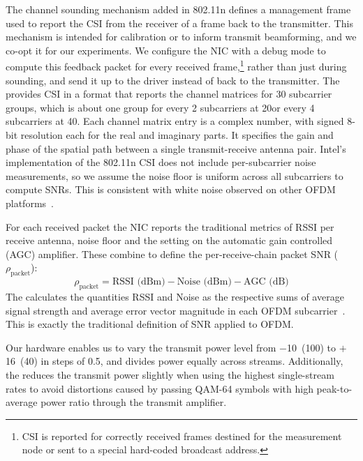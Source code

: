  The channel sounding mechanism added in 802.11n defines a management frame used to report the CSI from the receiver of a frame back to the transmitter. This mechanism is intended for calibration or to inform transmit beamforming, and we co-opt it for our experiments. We configure the NIC with a debug mode to compute this feedback packet for every received frame,\footnote{CSI is reported for correctly received frames destined for the measurement node or sent to a special hard-coded broadcast address.} rather than just during sounding, and send it up to the driver instead of back to the transmitter. The  provides CSI in a format that reports the channel matrices for 30 subcarrier groups, which is about one group for every 2 subcarriers at 20\MHz or every 4 subcarriers at 40\MHz. Each channel matrix entry is a complex number, with signed 8-bit resolution each for the real and imaginary parts. It specifies the gain and phase of the spatial path between a single transmit-receive antenna pair. Intel's implementation of the 802.11n CSI does not include per-subcarrier noise measurements, so we assume the noise floor is uniform across all subcarriers to compute SNRs. This is consistent with white noise observed on other OFDM platforms~\cite{Rahul_FARA}.

For each received packet the NIC reports the traditional metrics of RSSI per receive antenna, noise floor and the setting on the automatic gain controlled (AGC) amplifier. These combine to define the per-receive-chain packet SNR ($\rho_{\text{packet}}$):
\begin{equation}
\label{eq:per_chain_snr}
	\rho_{\text{packet}} = \text{RSSI (dBm)} - \text{Noise (dBm)} - \text{AGC (dB)}
\end{equation}
The  calculates the quantities RSSI and Noise as the respective sums of average signal strength and average error vector magnitude in each OFDM subcarrier~\cite{iwlwifi}. This is exactly the traditional definition of SNR applied to OFDM\@.

 Our hardware enables us to vary the transmit power level from $-$10\dBm~(100\uW) to $+$16\dBm~(40\mW) in steps of 0.5\dB, and divides power equally across streams. Additionally, the  reduces the transmit power slightly when using the highest single-stream rates to avoid distortions caused by passing QAM-64 symbols with high peak-to-average power ratio through the transmit amplifier.

